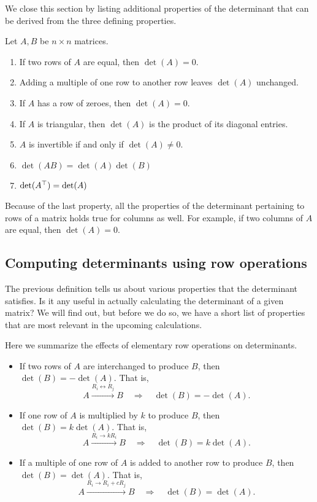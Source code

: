 \documentclass{ximera}
\begin{document}
We close this section by listing additional properties of the
determinant that can be derived from the three defining properties.

\begin{theorem}
  Let $A, B$ be $n \times n$ matrices.
  \begin{enumerate}
  \item If two rows of $A$ are equal, then $\det (A) = 0$.
  \item Adding a multiple of one row to another row leaves $\det (A)$
    unchanged.
  \item If $A$ has a row of zeroes, then $\det (A) = 0$.
  \item If $A$ is triangular, then $\det (A)$ is the product of its
    diagonal entries.
  \item $A$ is invertible if and only if $\det (A) \neq 0$.
  \item $\det (AB) = \det(A) \det(B)$
  \item $\det (A^\top) = \det(A)$
  \end{enumerate}
\end{theorem}

Because of the last property, all the properties of the determinant
pertaining to rows of a matrix holds true for columns as well. For
example, if two columns of $A$ are equal, then $\det(A) = 0$.


\subsection{Computing determinants using row operations}

The previous definition tells us about various properties that the
determinant satisfies. Is it any useful in actually calculating the
determinant of a given matrix? We will find out, but before we do so,
we have a short list of properties that are most relevant in the
upcoming calculations.

\begin{concept}
  Here we summarize the effects of elementary row operations on
  determinants.
  \begin{itemize}
  \item If two rows of $A$ are interchanged to produce $B$, then
    $\det(B) = -\det(A)$. That is,
    \[
      A \xrightarrow{R_i \leftrightarrow R_j} B
      \quad\Longrightarrow\quad
      \det(B) = -\det(A).
    \]
  \item If one row of $A$ is multiplied by $k$ to produce $B$, then
    $\det(B) = k \det(A)$. That is,
    \[
      A \xrightarrow{R_i \to k R_i} B
      \quad\Longrightarrow\quad
      \det(B) = k\det(A).
    \]
  \item If a multiple of one row of $A$ is added to another row to
    produce $B$, then $\det(B) = \det(A)$. That is,
    \[
      A \xrightarrow{R_i \to R_i + c R_j} B
      \quad\Longrightarrow\quad
      \det(B) = \det(A).
    \]
  \end{itemize}
\end{concept}
\end{document}
